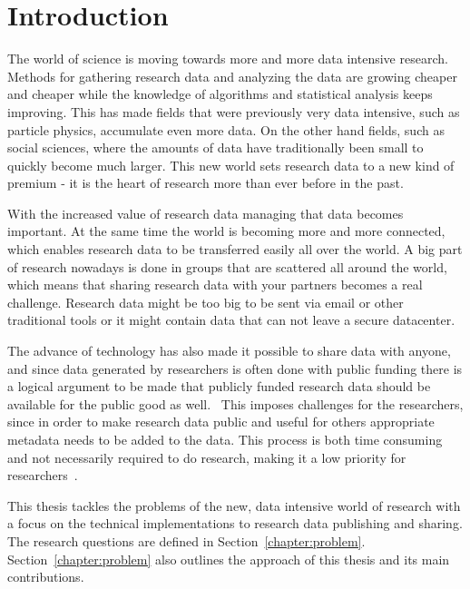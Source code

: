 \chapter{Introduction}
\label{chapter:intro}

The world of science is moving towards more and more data intensive research.
Methods for gathering research data and analyzing the data are growing
cheaper and cheaper while the knowledge of algorithms and statistical analysis
keeps improving. This has made fields that were previously very data intensive,
such as particle physics, accumulate even more data. On the other hand
fields, such as social sciences, where the amounts of data have
traditionally been small to quickly become much larger. This new world sets
research data to a new kind of premium - it is the heart of research more
than ever before in the past.~\cite{DBLP:books/ms/4paradigm09}

With the increased value of research data managing that data becomes important.
At the same time the world is becoming more and more connected, which enables research
data to be transferred easily all over the world. A big
part of research nowadays is done in groups that are scattered all around the
world, which means that sharing research data with your partners becomes a real challenge. 
Research data might be too big to be sent via email or other traditional tools
or it might contain data that can not leave a secure datacenter.~\cite{DBLP:journals/jbi/HarrisTTPGC09, DBLP:journals/jasis/Borgman12}

The advance of technology has also made it possible to share data with anyone,
and since data generated by researchers is often done with public funding there
is a logical argument to be made that publicly funded research data should be
available for the public good as well.~\cite{DBLP:journals/jasis/Borgman12} This imposes challenges for the
researchers, since in order to make research data public and useful for others
appropriate metadata needs to be added to the data. This process is both
time consuming and not necessarily required to do research, making it a low
priority for researchers~\cite{savage2009empirical}.

This thesis tackles the problems of the new, data intensive world of research
with a focus on the technical implementations to research data publishing and sharing.
The research questions are defined in Section~\ref{chapter:problem}. Section~\ref{chapter:problem} also outlines
the approach of this thesis and its main contributions.

